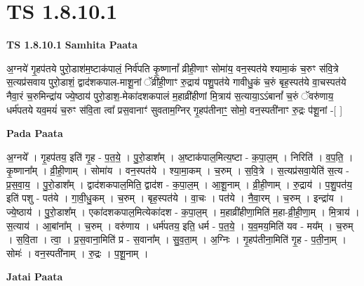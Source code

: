\documentclass[17pt]{extarticle}
\begin{document}
\section{ TS 1.8.10.1 }

\textbf{TS 1.8.10.1 } \newline
\textbf{Samhita Paata} \newline

अ॒ग्नये॑ गृ॒हप॑तये पुरो॒डाश॑म॒ष्टाक॑पालं॒ निर्व॑पति कृ॒ष्णानां᳚ व्रीही॒णाꣳ सोमा॑य॒ वन॒स्पत॑ये श्यामा॒कं च॒रुꣳ स॑वि॒त्रे स॒त्यप्र॑सवाय पुरो॒डाशं॒ द्वाद॑शकपाल-माशू॒नां ॅव्री॑ही॒णाꣳ रु॒द्राय॑ पशु॒पत॑ये गावीधु॒कं च॒रुं बृह॒स्पत॑ये वा॒चस्पत॑ये नैवा॒रं च॒रुमिन्द्रा॑य ज्ये॒ष्ठाय॑ पुरो॒डाश॒-मेका॑दशकपालं म॒हाव्री॑हीणां मि॒त्राय॑ स॒त्याया॒ऽऽंबानां᳚ च॒रुं ॅवरु॑णाय॒ धर्म॑पतये यव॒मयं॑ च॒रुꣳ स॑वि॒ता त्वा᳚ प्रस॒वानाꣳ॑ सुवताम॒ग्निर् गृ॒हप॑तीनाꣳ॒॒ सोमो॒ वन॒स्पती॑नाꣳ रु॒द्रः प॑शू॒नां -[ ] \newline

\textbf{Pada Paata} \newline

अ॒ग्नये᳚ । गृ॒हप॑तय॒ इति॑ गृ॒ह - प॒त॒ये॒ । पु॒रो॒डाश᳚म् । अ॒ष्टाक॑पाल॒मित्य॒ष्टा - क॒पा॒ल॒म् । निरिति॑ । व॒प॒ति॒ । कृ॒ष्णाना᳚म् । व्री॒ही॒णाम् । सोमा॑य । वन॒स्पत॑ये । श्या॒मा॒कम् । च॒रुम् । स॒वि॒त्रे । स॒त्यप्र॑सवा॒येति॑ स॒त्य - प्र॒स॒वा॒य॒ । पु॒रो॒डाश᳚म् । द्वाद॑शकपाल॒मिति॒ द्वाद॑श - क॒पा॒ल॒म् । आ॒शू॒नाम् । व्री॒ही॒णाम् । रु॒द्राय॑ । प॒शु॒पत॑य॒ इति॑ पशु - पत॑ये । गा॒वी॒धु॒कम् । च॒रुम् । बृह॒स्पत॑ये । वा॒चः । पत॑ये । नै॒वा॒रम् । च॒रुम् । इन्द्रा॑य । ज्ये॒ष्ठाय॑ । पु॒रो॒डाश᳚म् । एका॑दशकपाल॒मित्येका॑दश - क॒पा॒ल॒म् । म॒हाव्री॑हीणा॒मिति॑ म॒हा-व्री॒ही॒णा॒म् । मि॒त्राय॑ । स॒त्याय॑ । आ॒बांना᳚म् । च॒रुम् । वरु॑णाय । धर्म॑पतय॒ इति॒ धर्म - प॒त॒ये॒ । य॒व॒मय॒मिति॑ यव - मय᳚म् । च॒रुम् । स॒वि॒ता । त्वा॒ । प्र॒स॒वाना॒मिति॑ प्र - स॒वाना᳚म् । सु॒व॒ता॒म् । अ॒ग्निः । गृ॒हप॑तीना॒मिति॑ गृ॒ह - प॒ती॒ना॒म् । सोमः॑ । वन॒स्पती॑नाम् । रु॒द्रः । प॒शू॒नाम् ।  \newline



\textbf{Jatai Paata} \newline
\end{document}
